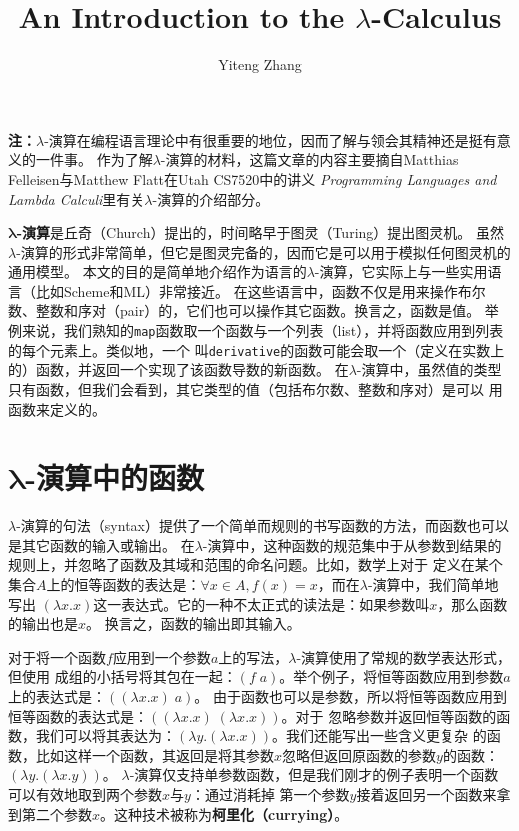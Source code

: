 \documentclass[12pt]{article}
\title{An Introduction to the $\lambda$-Calculus}
\author{Yiteng Zhang}
\begin{document}
\maketitle

\noindent{}\textbf{注：}$\lambda$-演算在编程语言理论中有很重要的地位，因而了解与领会其精神还是挺有意义的一件事。
作为了解$\lambda$-演算的材料，这篇文章的内容主要摘自Matthias Felleisen与Matthew Flatt在Utah CS7520中的讲义
\textit{Programming Languages and Lambda Calculi}里有关$\lambda$-演算的介绍部分。

\vspace{1em}
\indent{}\textbf{$\boldsymbol{\lambda}$-演算}是丘奇（Church）提出的，时间略早于图灵（Turing）提出图灵机。
虽然$\lambda$-演算的形式非常简单，但它是图灵完备的，因而它是可以用于模拟任何图灵机的通用模型。
本文的目的是简单地介绍作为语言的$\lambda$-演算，它实际上与一些实用语言（比如Scheme和ML）非常接近。
在这些语言中，函数不仅是用来操作布尔数、整数和序对（pair）的，它们也可以操作其它函数。换言之，函数是值。
举例来说，我们熟知的\texttt{map}函数取一个函数与一个列表（list），并将函数应用到列表的每个元素上。类似地，一个
叫\texttt{derivative}的函数可能会取一个（定义在实数上的）函数，并返回一个实现了该函数导数的新函数。
在$\lambda$-演算中，虽然值的类型只有函数，但我们会看到，其它类型的值（包括布尔数、整数和序对）是可以
用函数来定义的。

\section{$\boldsymbol{\lambda}$-演算中的函数}
\indent{}$\lambda$-演算的句法（syntax）提供了一个简单而规则的书写函数的方法，而函数也可以是其它函数的输入或输出。
在$\lambda$-演算中，这种函数的规范集中于从参数到结果的规则上，并忽略了函数及其域和范围的命名问题。比如，数学上对于
定义在某个集合$A$上的恒等函数的表达是：$\forall x \in A,f(x) = x$，而在$\lambda$-演算中，我们简单地写出
$(\lambda x.x)$这一表达式。它的一种不太正式的读法是：如果参数叫$x$，那么函数的输出也是$x$。
换言之，函数的输出即其输入。

\indent{}对于将一个函数$f$应用到一个参数$a$上的写法，$\lambda$-演算使用了常规的数学表达形式，但使用
成组的小括号将其包在一起：$(f\;a)$。举个例子，将恒等函数应用到参数$a$上的表达式是：$((\lambda x.x)\;a)$。
由于函数也可以是参数，所以将恒等函数应用到恒等函数的表达式是：$((\lambda x.x)\;(\lambda x.x))$。对于
忽略参数并返回恒等函数的函数，我们可以将其表达为：$(\lambda y.(\lambda x.x))$。我们还能写出一些含义更复杂
的函数，比如这样一个函数，其返回是将其参数$x$忽略但返回原函数的参数$y$的函数：$(\lambda y.(\lambda x.y))$。
$\lambda$-演算仅支持单参数函数，但是我们刚才的例子表明一个函数可以有效地取到两个参数$x$与$y$：通过消耗掉
第一个参数$y$接着返回另一个函数来拿到第二个参数$x$。这种技术被称为\textbf{柯里化（currying）}。
\end{document}
